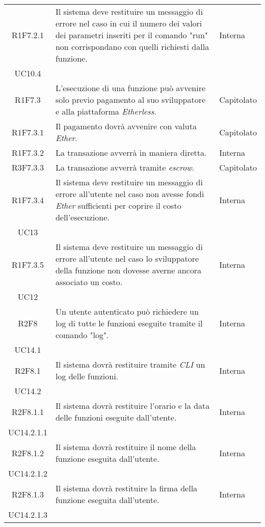 \begin{longtable}{|c|p{8cm}|C{2cm}|}
	R1F7.2.1 &  Il sistema deve restituire un messaggio di errore nel caso in cui il numero dei valori dei parametri inseriti per il comando "run" non corrispondano con quelli richiesti dalla funzione.  & \centering Interna \\ UC10.4 \tabularnewline

	R1F7.3 &  L'esecuzione di una funzione può avvenire solo previo pagamento al suo sviluppatore e alla piattaforma \textit{Etherless}. & Capitolato \\

	R1F7.3.1 &  Il pagamento dovrà avvenire con valuta \textit{Ether\glos}. & Capitolato \\

	R1F7.3.2 &  La transazione avverrà in maniera diretta. & Interna \\

	R3F7.3.3 &  La transazione avverrà tramite \textit{escrow\glos}. & Capitolato \\

	R1F7.3.4 &  Il sistema deve restituire un messaggio di errore all'utente nel caso non avesse fondi  \textit{Ether\glos} sufficienti per coprire il costo dell'esecuzione. & \centering Interna \\ UC13 \tabularnewline

	R1F7.3.5 &  Il sistema deve restituire un messaggio di errore all'utente nel caso lo sviluppatore della funzione non dovesse averne ancora associato un costo. & \centering Interna \\ UC12 \tabularnewline

	R2F8 &  Un utente autenticato può richiedere un log di tutte le funzioni eseguite tramite il comando "log". & \centering Interna \\ UC14.1 \tabularnewline

	R2F8.1 &  Il sistema dovrà restituire tramite \textit{CLI\glo} un log delle funzioni. & \centering Interna \\ UC14.2 \tabularnewline

	R2F8.1.1 &  Il sistema dovrà restituire l'orario e la data delle funzioni eseguite dall'utente. & \centering Interna \\ UC14.2.1.1 \tabularnewline

	R2F8.1.2 &  Il sistema dovrà restituire il nome della funzione eseguita dall'utente. & \centering Interna \\ UC14.2.1.2 \tabularnewline

	R2F8.1.3 &  Il sistema dovrà restituire la firma della funzione eseguita dall'utente. & \centering Interna \\ UC14.2.1.3 \tabularnewline


\end{longtable}
